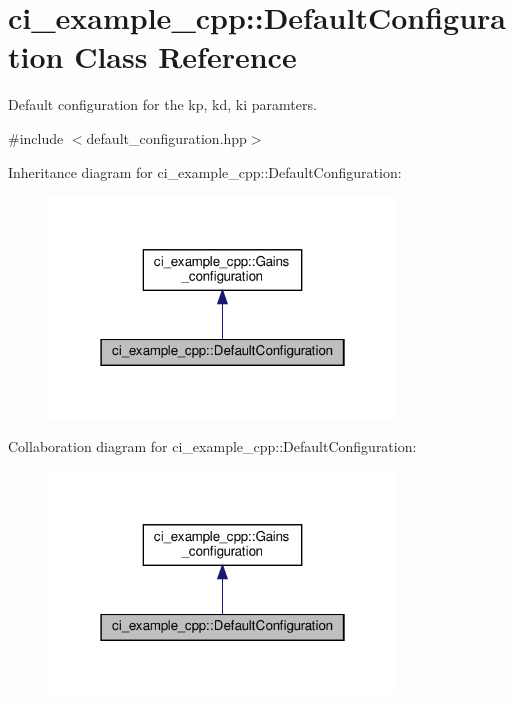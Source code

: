 \hypertarget{classci__example__cpp_1_1DefaultConfiguration}{}\section{ci\+\_\+example\+\_\+cpp\+:\+:Default\+Configuration Class Reference}
\label{classci__example__cpp_1_1DefaultConfiguration}


Default configuration for the kp, kd, ki paramters.  




{\ttfamily \#include $<$default\+\_\+configuration.\+hpp$>$}



Inheritance diagram for ci\+\_\+example\+\_\+cpp\+:\+:Default\+Configuration\+:
\nopagebreak
\begin{figure}[H]
\begin{center}
\leavevmode
\includegraphics[width=262pt]{classci__example__cpp_1_1DefaultConfiguration__inherit__graph}
\end{center}
\end{figure}


Collaboration diagram for ci\+\_\+example\+\_\+cpp\+:\+:Default\+Configuration\+:
\nopagebreak
\begin{figure}[H]
\begin{center}
\leavevmode
\includegraphics[width=262pt]{classci__example__cpp_1_1DefaultConfiguration__coll__graph}
\end{center}
\end{figure}
